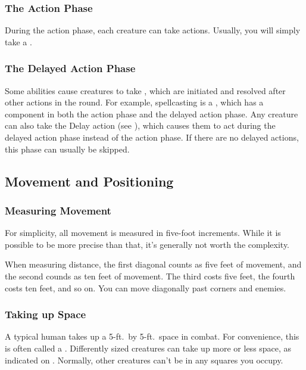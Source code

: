        \subsubsection{The Action Phase}\label{The Action Phase}
            During the action phase, each creature can take actions.
            Usually, you will simply take a .

        \subsubsection{The Delayed Action Phase}\label{The Delayed Action Phase}
            Some abilities cause creatures to take , which are initiated and resolved after other actions in the round.
            For example, spellcasting is a , which has a component in both the action phase and the delayed action phase.
            Any creature can also take the Delay action (see ), which causes them to act during the delayed action phase instead of the action phase.
            If there are no delayed actions, this phase can usually be skipped.

    \subsection{Movement and Positioning}\label{Movement and Positioning}

        \subsubsection{Measuring Movement}

            For simplicity, all movement is measured in five-foot increments.
            While it is possible to be more precise than that, it's generally not worth the complexity.

             When measuring distance, the first diagonal counts as five feet of movement, and the second counds as ten feet of movement.
            The third costs five feet, the fourth costs ten feet, and so on.
            You can move diagonally past corners and enemies.

        \subsubsection{Taking up Space}
            A typical human takes up a 5-ft.\ by 5-ft.\ space in combat.
            For convenience, this is often called a .
            Differently sized creatures can take up more or less space, as indicated on .
            Normally, other creatures can't be in any squares you occupy.

